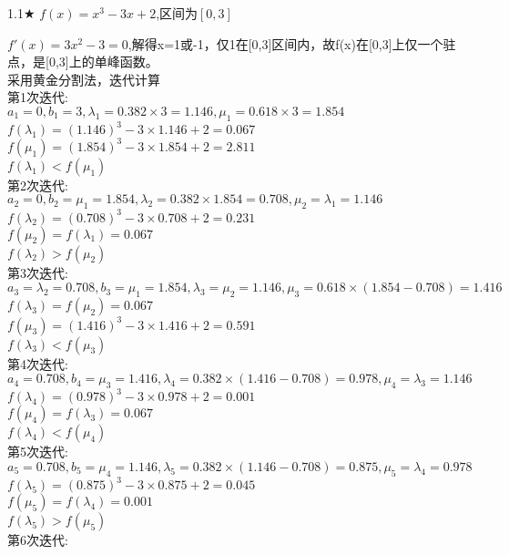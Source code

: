 \begin{problem}{1.1$\bigstar$}
    $f(x)=x^3-3x+2$,区间为$[0,3]$
\end{problem}
\begin{solution}
    $f'(x)=3x^2-3=0$,解得x=1或-1，仅1在[0,3]区间内，故f(x)在[0,3]上仅一个驻点，是[0,3]上的单峰函数。\\
    采用黄金分割法，迭代计算\\
    第1次迭代:\\
    $a_1=0,b_1=3,\lambda_1=0.382\times3=1.146,\mu_1=0.618\times3=1.854$\\
    $f(\lambda_1)=(1.146)^3-3\times1.146+2=0.067$\\
    $f(\mu_1)=(1.854)^3-3\times1.854+2=2.811$\\
    $f(\lambda_1)<f(\mu_1)$\\
    第2次迭代:\\
    $a_2=0,b_2=\mu_1=1.854,\lambda_2=0.382\times1.854=0.708,\mu_2=\lambda_1=1.146$\\
    $f(\lambda_2)=(0.708)^3-3\times0.708+2=0.231$\\
    $f(\mu_2)=f(\lambda_1)=0.067$\\
    $f(\lambda_2)>f(\mu_2)$\\
    第3次迭代:\\
    $a_3=\lambda_2=0.708,b_3=\mu_1=1.854,\lambda_3=\mu_2=1.146,\mu_3=0.618\times(1.854-0.708)=1.416$\\
    $f(\lambda_3)=f(\mu_2)=0.067$\\
    $f(\mu_3)=(1.416)^3-3\times1.416+2=0.591$\\
    $f(\lambda_3)<f(\mu_3)$\\
    第4次迭代:\\
    $a_4=0.708,b_4=\mu_3=1.416,\lambda_4=0.382\times(1.416-0.708)=0.978,\mu_4=\lambda_3=1.146$\\
    $f(\lambda_4)=(0.978)^3-3\times0.978+2=0.001$\\
    $f(\mu_4)=f(\lambda_3)=0.067$\\
    $f(\lambda_4)<f(\mu_4)$\\
    第5次迭代:\\
    $a_5=0.708,b_5=\mu_4=1.146,\lambda_5=0.382\times(1.146-0.708)=0.875,\mu_5=\lambda_4=0.978$\\
    $f(\lambda_5)=(0.875)^3-3\times0.875+2=0.045$\\
    $f(\mu_5)=f(\lambda_4)=0.001$\\
    $f(\lambda_5)>f(\mu_5)$\\
    第6次迭代:\\

\end{solution}
